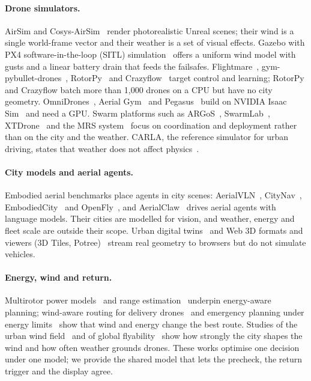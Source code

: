 \paragraph{Drone simulators.} AirSim and Cosys-AirSim~\cite{shah2017airsim,jansen2023cosysairsim} render photorealistic
Unreal scenes; their wind is a single world-frame vector and their weather is a set of visual effects. Gazebo with PX4
software-in-the-loop (SITL) simulation~\cite{koenig2004gazebo,meier2015px4,furrer2016rotors} offers a uniform wind model with gusts and a linear battery
drain that feeds the failsafes. Flightmare~\cite{song2020flightmare}, gym-pybullet-drones~\cite{panerati2021learning},
RotorPy~\cite{folk2023rotorpy} and Crazyflow~\cite{schuck2026crazyflow} target control and learning; RotorPy and
Crazyflow batch more than 1,000 drones on a CPU but have no city geometry. OmniDrones~\cite{xu2024omnidrones}, Aerial
Gym~\cite{kulkarni2025aerialgym} and Pegasus~\cite{jacinto2024pegasus} build on NVIDIA Isaac
Sim~\cite{nvidia2025isaaclab,mittal2023orbit} and need a GPU. Swarm platforms such as
ARGoS~\cite{pinciroli2012argos}, SwarmLab~\cite{soria2020swarmlab}, XTDrone~\cite{xiao2020xtdrone} and the MRS
system~\cite{baca2021mrs} focus on coordination and deployment rather than on the city and the weather. CARLA, the
reference simulator for urban driving, states that weather does not affect physics~\cite{dosovitskiy2017carla}.

\paragraph{City models and aerial agents.} Embodied aerial benchmarks place agents in city scenes:
AerialVLN~\cite{liu2023aerialvln}, CityNav~\cite{lee2025citynav}, EmbodiedCity~\cite{gao2024embodiedcity} and
OpenFly~\cite{gao2025openfly}, and AerialClaw~\cite{li2026aerialclaw} drives aerial agents with language models.
Their cities are modelled for vision, and weather, energy and fleet scale are outside their scope. Urban digital
twins~\cite{batty2018digitaltwins,ketzler2020digitaltwins,shahat2021citydigitaltwin} and Web 3D formats and viewers
(3D Tiles, Potree)~\cite{ogc2023_3dtiles,schuetz2020octree,discher2019webpointclouds} stream real geometry to browsers
but do not simulate vehicles.

\paragraph{Energy, wind and return.} Multirotor power models~\cite{liu2017power,stolaroff2018energy,dorling2017vehicle,zhang2021energy}
and range estimation~\cite{bauersfeld2022range} underpin energy-aware planning; wind-aware routing for delivery
drones~\cite{ito2022wind,chakrabarty2011energy} and emergency planning under energy limits~\cite{tenharmsel2017emergency}
show that wind and energy change the best route. Studies of the urban wind
field~\cite{galway2011urban,ware2016analysis,kakavitsas2024quadrotor} and of global flyability~\cite{gao2021weather}
show how strongly the city shapes the wind and how often weather grounds drones. These works optimise one decision
under one model; we provide the shared model that lets the precheck, the return trigger and the display agree.

